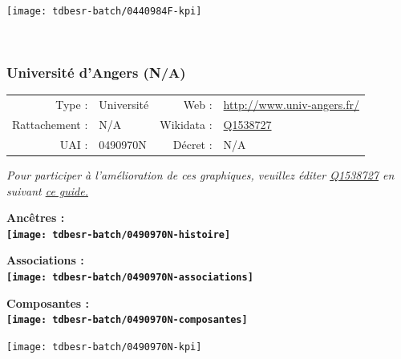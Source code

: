 \documentclass[12pt,french,]{article}
\begin{document}
\begin{center}\texttt{[image: tdbesr-batch/0440984F-kpi]} \end{center}\checkoddpage

\ifoddpage ~\newpage \fi   

\hypertarget{universituxe9-dangers-na}{%
\subsubsection{Université d'Angers
(N/A)}\label{universituxe9-dangers-na}}

\begin{tabular*}{\textwidth}{rp{5cm}rl}  
\hline  
Type : & Université & Web : &\href{http://www.univ-angers.fr/}{http://www.univ-angers.fr/} \\  
Rattachement : & N/A & Wikidata : & \href{https://www.wikidata.org/entity/Q1538727}{Q1538727} \\  
UAI : & 0490970N & Décret : & N/A \\  
\hline  
\end{tabular*}

\textit{\scriptsize Pour participer à l'amélioration de ces graphiques, veuillez éditer  \href{https://www.wikidata.org/entity/Q1538727}{Q1538727}  en suivant \href{https://github.com/cpesr/wikidataESR/blob/master/Rmd/wikidataESR.md}{ce guide.}}

\vspace{1cm}  
\begin{minipage}[b]{0.50\textwidth}\begin{center} \bf Ancêtres : \\  
\texttt{[image: tdbesr-batch/0490970N-histoire]} \end{center}\end{minipage}\begin{minipage}[b]{0.50\textwidth}\begin{center} \bf Associations : \\  
\texttt{[image: tdbesr-batch/0490970N-associations]} \end{center}\end{minipage}

\hrulefill

\begin{center} \bf Composantes : \\  
\texttt{[image: tdbesr-batch/0490970N-composantes]} \end{center}

\begin{center}\texttt{[image: tdbesr-batch/0490970N-kpi]} \end{center}\checkoddpage
\end{document}
